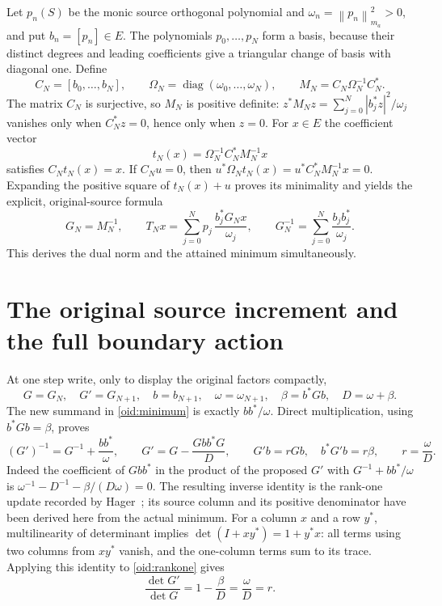 \documentclass[11pt,a4paper]{article}
\newcommand{\diag}{\operatorname{diag}}
\newcommand{\norm}[1]{\left\lVert#1\right\rVert}
\begin{document}
Let $p_n(S)$ be the monic source orthogonal polynomial and
$\omega_n=\norm{p_n}_{m_a}^2>0$, and put $b_n=[p_n]\in E$.
The polynomials $p_0,\ldots,p_N$ form a basis, because their distinct
degrees and leading coefficients give a triangular change of basis
with diagonal one. Define
\[
 C_N=[b_0,\ldots,b_N],\qquad
 \Omega_N=\diag(\omega_0,\ldots,\omega_N),\qquad
 M_N=C_N\Omega_N^{-1}C_N^*.
\]
The matrix $C_N$ is surjective, so $M_N$ is positive definite:
$z^*M_Nz=\sum_{j=0}^N|b_j^*z|^2/\omega_j$ vanishes only when
$C_N^*z=0$, hence only when $z=0$. For $x\in E$ the coefficient
vector
\[
 t_N(x)=\Omega_N^{-1}C_N^*M_N^{-1}x
\]
satisfies $C_Nt_N(x)=x$. If $C_Nu=0$, then
$u^*\Omega_Nt_N(x)=u^*C_N^*M_N^{-1}x=0$.
Expanding the positive square of $t_N(x)+u$ proves its minimality
and yields the explicit, original-source formula
\begin{equation}\label{oid:minimum}
 G_N=M_N^{-1},\qquad
 T_Nx=\sum_{j=0}^N p_j\,
 \frac{b_j^*G_Nx}{\omega_j},\qquad
 G_N^{-1}=\sum_{j=0}^N\frac{b_jb_j^*}{\omega_j}.
\end{equation}
This derives the dual norm and the attained minimum simultaneously.

\section{The original source increment and the full boundary action}

At one step write, only to display the original factors compactly,
\[
 G=G_N,\quad G'=G_{N+1},\quad b=b_{N+1},\quad
 \omega=\omega_{N+1},\quad \beta=b^*Gb,\quad D=\omega+\beta.
\]
The new summand in \eqref{oid:minimum} is exactly $bb^*/\omega$.
Direct multiplication, using $b^*Gb=\beta$, proves
\begin{equation}\label{oid:rankone}
 (G')^{-1}=G^{-1}+\frac{bb^*}{\omega},\qquad
 G'=G-\frac{Gbb^*G}{D},\qquad
 G'b=rGb,\quad b^*G'b=r\beta,
 \qquad r=\frac{\omega}{D}.
\end{equation}
Indeed the coefficient of $Gbb^*$ in the product of the proposed
$G'$ with $G^{-1}+bb^*/\omega$ is
$\omega^{-1}-D^{-1}-\beta/(D\omega)=0$.
The resulting inverse identity is the rank-one update recorded by
Hager~\cite[p.~221, equation~(2)]{Hager}; its source column and its
positive denominator have been derived here from the actual minimum.
For a column $x$ and a row $y^*$, multilinearity of determinant
implies $\det(I+xy^*)=1+y^*x$: all terms using two columns from
$xy^*$ vanish, and the one-column terms sum to its trace.
Applying this identity to \eqref{oid:rankone} gives
\begin{equation}\label{oid:r}
 \frac{\det G'}{\det G}=1-\frac\beta D
 =\frac\omega D=r.
\end{equation}
\end{document}
